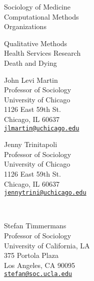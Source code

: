 \documentclass[11pt,article,oneside]{memoir}
\begin{document}
\medskip
{}
\bigskip

\vskip 25pt

\noindent\begin{minipage}{\textwidth}
	\begin{minipage}{0.5\textwidth}
	Sociology of Medicine \\ Computational Methods \\ Organizations
	\end{minipage}\hfill
	\begin{minipage}{0.5\textwidth}
	Qualitative Methods \\ Health Services Research \\ Death and Dying
	\end{minipage}%
\end{minipage}

\bigskip
{}
\bigskip

\begin{minipage}[t]{0.48\textwidth}
	John Levi Martin \\
	Professor of Sociology \\
	University of Chicago \\
	1126 East 59th St. \\
	Chicago, IL 60637 \\
	\texttt{\href{mailto:jlmartin@uchicago.edu}{jlmartin@uchicago.edu}}
\end{minipage}
\hfill
\begin{minipage}[t]{0.48\textwidth}
	Jenny Trinitapoli \\
	Professor of Sociology \\
	University of Chicago \\
	1126 East 59th St. \\
	Chicago, IL 60637 \\
	\texttt{\href{mailto:jennytrini@uchicago.edu}{jennytrini@uchicago.edu}} \\
\end{minipage} \\

\bigskip
	
\begin{minipage}[t]{0.48\textwidth}
	Stefan Timmermans \\
	Professor of Sociology \\
	University of California, LA \\
	375 Portola Plaza \\
	Los Angeles, CA 90095 \\
	\texttt{\href{mailto:stefan@soc.ucla.edu}{stefan@soc.ucla.edu}}
\end{minipage}
\end{document}
